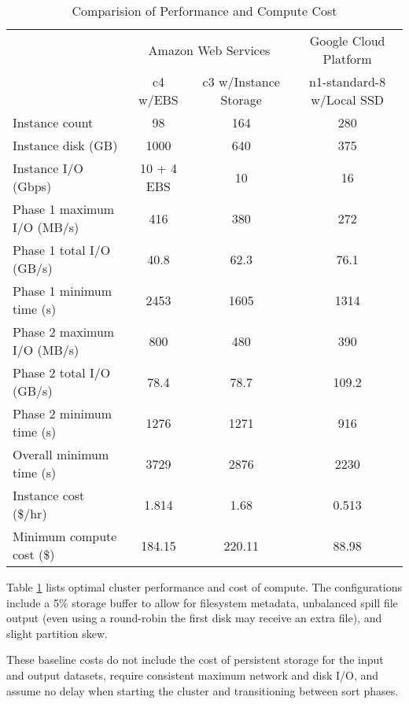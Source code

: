 \documentclass{article}
\begin{document}
\begin{table}
  \begin{adjustwidth}{-1.5in}{-1.5in}  
    \centering
    \begin{tabular}{ | l | c | c | c | }
      \hline
      & \multicolumn{2}{|c|}{Amazon Web Services} & Google Cloud Platform \\
      \cline{2-4}
      & c4 w/EBS & c3 w/Instance Storage & n1-standard-8 w/Local SSD \\
      \hline
      Instance count & 98 & 164 & 280 \\
      Instance disk (GB) & 1000 & 640 & 375 \\
      Instance I/O (Gbps) & 10 + 4 EBS & 10 & 16 \\
      \hline
      Phase 1 maximum I/O (MB/s) & 416 & 380 & 272 \\
      Phase 1 total I/O (GB/s) & 40.8 & 62.3 & 76.1 \\
      Phase 1 minimum time (s) & 2453 & 1605 & 1314 \\
      \hline
      Phase 2 maximum I/O (MB/s) & 800 & 480 & 390 \\
      Phase 2 total I/O (GB/s) & 78.4 & 78.7 & 109.2 \\
      Phase 2 minimum time (s) & 1276 & 1271 & 916 \\
      \hline
      Overall minimum time (s) & 3729 & 2876 & 2230 \\
      Instance cost (\$/hr) & 1.814 & 1.68 & 0.513 \\
      Minimum compute cost (\$) & 184.15 & 220.11 & 88.98 \\
      \hline
    \end{tabular}
    \caption{Comparision of Performance and Compute Cost}
    \label{table:performancecomparision}
  \end{adjustwidth}
\end{table}

Table \ref{table:performancecomparision} lists optimal cluster performance and cost of compute. The configurations include a 5\% storage buffer to allow for filesystem metadata, unbalanced spill file output (even using a round-robin the first disk may receive an extra file), and slight partition skew.

These baseline costs do not include the cost of persistent storage for the input and output datasets, require consistent maximum network and disk I/O, and assume no delay when starting the cluster and transitioning between sort phases.
\end{document}
